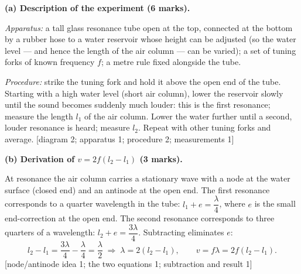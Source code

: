 \documentclass[11pt]{article}
\newcommand{\legende}[1]{\par\vspace{6pt}{\popsemi\fontsize{9}{11.5}\selectfont\color{popmuted}#1}}
\begin{document}
\begin{corrige}
\textbf{(a) Description of the experiment (6 marks).}\par
\emph{Apparatus:} a tall glass resonance tube open at the top, connected at the bottom by a rubber hose to a water reservoir whose height can be adjusted (so the water level — and hence the length of the air column — can be varied); a set of tuning forks of known frequency $f$; a metre rule fixed alongside the tube.
\begin{center}
\legende{Resonance tube apparatus}
\end{center}
\emph{Procedure:} strike the tuning fork and hold it above the open end of the tube. Starting with a high water level (short air column), lower the reservoir slowly until the sound becomes suddenly much louder: this is the first resonance; measure the length $l_{1}$ of the air column. Lower the water further until a second, louder resonance is heard; measure $l_{2}$. Repeat with other tuning forks and average. \hfill [diagram 2; apparatus 1; procedure 2; measurements 1]

\textbf{(b) Derivation of $v = 2f(l_{2}-l_{1})$ (3 marks).}\par
At resonance the air column carries a stationary wave with a node at the water surface (closed end) and an antinode at the open end. The first resonance corresponds to a quarter wavelength in the tube: $l_{1} + e = \dfrac{\lambda}{4}$, where $e$ is the small end-correction at the open end. The second resonance corresponds to three quarters of a wavelength: $l_{2} + e = \dfrac{3\lambda}{4}$. Subtracting eliminates $e$:
\[ l_{2} - l_{1} = \frac{3\lambda}{4} - \frac{\lambda}{4} = \frac{\lambda}{2} \;\Rightarrow\; \lambda = 2(l_{2}-l_{1}), \qquad v = f\lambda = 2f(l_{2}-l_{1}). \]
\hfill [node/antinode idea 1; the two equations 1; subtraction and result 1]


\end{corrige}
\end{document}
